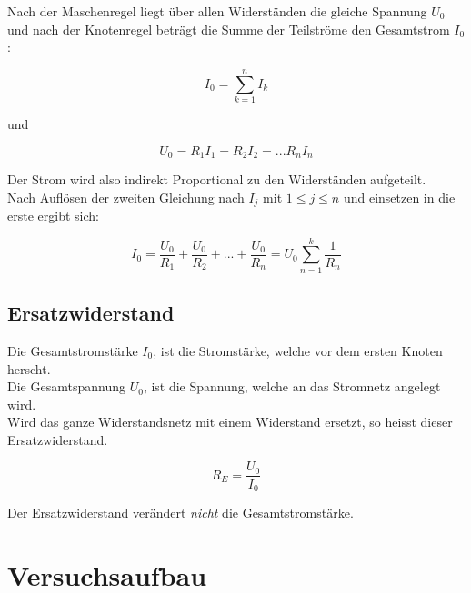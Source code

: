 \documentclass[a4paper,12pt]{article}
\begin{document}
Nach der Maschenregel liegt über allen Widerständen die gleiche Spannung $U_0$ und nach der 
Knotenregel beträgt die Summe der Teilströme den Gesamtstrom $I_0$:

\[ I_0 = \sum_{k=1}^{n} I_k \]

und 

\[ U_0 = R_1 I_1 = R_2 I_2 = ...R_n I_n \]

Der Strom wird also indirekt Proportional zu den Widerständen aufgeteilt. \\
Nach Auflösen der zweiten Gleichung nach $I_j$ mit $1 \leq j \leq n$ und einsetzen in die erste
ergibt sich:

\[ I_0 = \frac{U_0}{R_1} + \frac{U_0}{R_2} + ... + \frac{U_0}{R_n} = U_0 \sum_{n=1}^k \frac{1}{R_n} \]



\subsection{Ersatzwiderstand}

Die Gesamtstromstärke $I_0$, ist die Stromstärke, welche vor dem ersten Knoten herscht. \\
Die Gesamtspannung $U_0$, ist die Spannung, welche an das Stromnetz angelegt wird. \\
Wird das ganze Widerstandsnetz mit einem Widerstand ersetzt, so heisst dieser Ersatzwiderstand. 

\[ R_E = \frac{U_0}{I_0} \]

Der Ersatzwiderstand verändert \textit{nicht} die Gesamtstromstärke. 

\section{Versuchsaufbau}

\begin{figure}[H]
\centering
{}
\end{figure}
\end{document}
